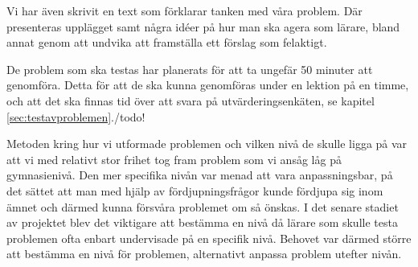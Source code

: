 \textcolor{lila}{Vi har även skrivit en text som förklarar tanken med våra problem. Där presenteras upplägget samt några idéer på hur man ska agera som lärare, bland annat genom att undvika att framställa ett förslag som felaktigt.}

\textcolor{lila}{De problem som ska testas har planerats för att ta ungefär 50 minuter att genomföra. Detta för att de ska kunna genomföras under en lektion på en timme, och att det ska finnas tid över att svara på utvärderingsenkäten, se kapitel \ref{sec:testavproblemen}./todo{!}}

\textcolor{Mahogany}{Metoden kring hur vi utformade problemen och vilken nivå de skulle ligga på var att vi med relativt stor frihet tog fram problem som vi ansåg låg på gymnasienivå.
Den mer specifika nivån var menad att vara anpassningsbar, på det sättet att man med hjälp av fördjupningsfrågor kunde fördjupa sig inom ämnet och därmed kunna försvåra problemet om så önskas.
I det senare stadiet av projektet blev det viktigare att bestämma en nivå då lärare som skulle testa problemen ofta enbart undervisade på en specifik nivå. Behovet var därmed större att bestämma en nivå för problemen, alternativt anpassa problem utefter nivån.}